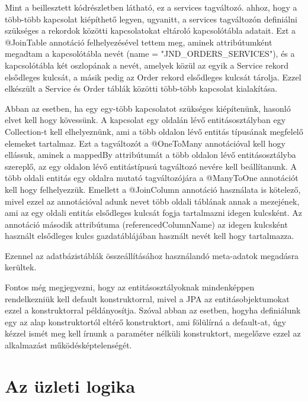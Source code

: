 \documentclass[centeredchapter]{thesis-ekf}
\theoremstyle{definition}
\theoremstyle{remark}
\begin{document}


Mint a beillesztett kódrészletben látható, ez a services tagváltozó. ahhoz, hogy a több-több kapcsolat kiépíthető legyen, ugyanitt, a services tagváltozón definiálni szükséges a rekordok közötti kapcsolatokat eltároló kapcsolótábla adatait. Ezt a @JoinTable annotáció felhelyezésével tettem meg, aminek attribútumként megadtam a kapcsolótábla nevét (name = "JND\_ORDERS\_SERVICES"), és a kapcsolótábla két oszlopának a nevét, amelyek közül az egyik a Service rekord elsődleges kulcsát, a másik pedig az Order rekord elsődleges kulcsát tárolja. Ezzel elkészült a Service és Order táblák közötti több-több kapcsolat kialakítása.

Abban az esetben, ha egy egy-több kapcsolatot szükséges kiépítenünk, hasonló elvet kell hogy kövessünk. A kapcsolat egy oldalán lévő entitásosztályban egy Collection-t kell elhelyeznünk, ami a több oldalon lévő entitás típusának megfelelő elemeket tartalmaz. Ezt a tagváltozót a @OneToMany annotációval kell hogy ellássuk, aminek a mappedBy attribútumát a több oldalon lévő entitásosztályba szereplő, az egy oldalon lévő entitástípusú tagváltozó nevére kell beállítanunk. 
A több oldali entitás egy oldalra mutató tagváltozójára a @ManyToOne annotációt kell hogy felhelyezzük. Emellett a @JoinColumn annotáció használata is kötelező, mivel ezzel az annotációval adunk nevet több oldali táblának annak a mezejének, ami az egy oldali entitás elsődleges kulcsát fogja tartalmazni idegen kulcsként. Az annotáció második attribútuma (referencedColumnName) az idegen kulcsként használt elsődleges kulcs gazdatáblájában használt nevét kell hogy tartalmazza.

Ezennel az adatbázistáblák összeállításához használandó meta-adatok megadásra kerültek.

Fontos még megjegyezni, hogy az entitásosztályoknak mindenképpen rendelkezniük kell default konstruktorral, mivel a JPA az entitásobjektumokat ezzel a konstruktorral példányosítja. Szóval abban az esetben, hogyha definiálunk egy az alap konstruktortól eltérő konstruktort, ami fölülírná a default-at, úgy kézzel ismét meg kell írnunk a paraméter nélküli konstruktort, megelőzve ezzel az alkalmazást működésképtelenségét. 

\section{Az üzleti logika}
\end{document}
